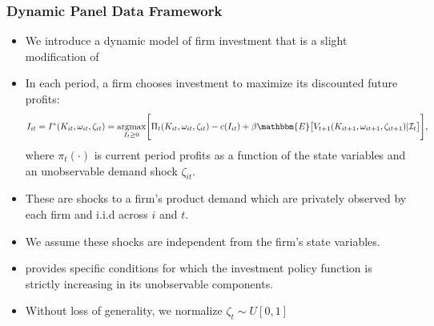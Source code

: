 \documentclass{beamer}
\begin{document}
\begin{frame}
\frametitle{Dynamic Panel Data Framework}
\begin{itemize}
	\item We introduce a dynamic model of firm investment that is a slight modification of \cite{Ericson1995}
	\item In each period, a firm chooses investment to maximize its discounted future profits:
	\scriptsize
		\begin{equation} \label{valuefn}
		I_{it}=I^{*}(K_{it}, \omega_{it}, \zeta_{it})=\underset{I_{t}\geq 0}{\operatorname{argmax}}\Bigg[\Pi_{t}(K_{it}, \omega_{it}, \zeta_{it})-c(I_{it})+\beta\mathbbm{E}\big[V_{t+1}(K_{it+1}, \omega_{it+1}, \zeta_{it+1})|\mathcal{I}_{t}\big]\Bigg],
		\end{equation}
		\normalsize
	where $\pi_{t}(\cdot)$ is current period profits as a function of the state variables and an unobservable demand shock $\zeta_{it}$. 
	\item These are shocks to a firm's product demand which are privately observed by each firm and i.i.d across $i$ and $t$. 
	\item We assume these shocks are independent from the firm's state variables.  
	\item \cite{Pakesa} provides specific conditions for which the investment policy function is strictly increasing in its unobservable components.
	\item  Without loss of generality, we normalize $\zeta_{t}\sim U[0,1]$
	\end{itemize}
\end{frame}


\end{document}
